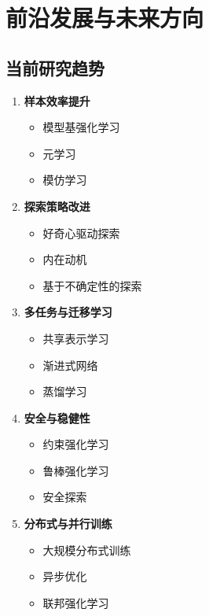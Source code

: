 \section{前沿发展与未来方向}

\subsection{当前研究趋势}

\begin{enumerate}
    \item \textbf{样本效率提升}
    \begin{itemize}
        \item 模型基强化学习
        \item 元学习
        \item 模仿学习
    \end{itemize}
    
    \item \textbf{探索策略改进}
    \begin{itemize}
        \item 好奇心驱动探索
        \item 内在动机
        \item 基于不确定性的探索
    \end{itemize}
    
    \item \textbf{多任务与迁移学习}
    \begin{itemize}
        \item 共享表示学习
        \item 渐进式网络
        \item 蒸馏学习
    \end{itemize}
    
    \item \textbf{安全与稳健性}
    \begin{itemize}
        \item 约束强化学习
        \item 鲁棒强化学习
        \item 安全探索
    \end{itemize}
    
    \item \textbf{分布式与并行训练}
    \begin{itemize}
        \item 大规模分布式训练
        \item 异步优化
        \item 联邦强化学习
    \end{itemize}
\end{enumerate}

